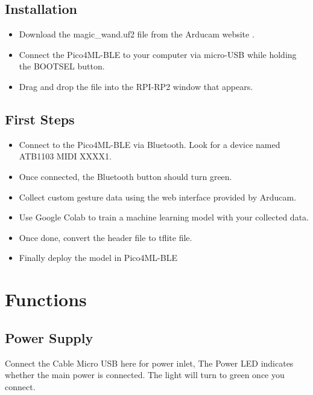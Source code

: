 \section{Installation}
\begin{itemize}
    \item Download the magic\_wand.uf2 file from the Arducam website .
    \item Connect the Pico4ML-BLE to your computer via micro-USB while holding the BOOTSEL button.
    \item Drag and drop the file   into the RPI-RP2 window that appears.\cite{arducamBuildMagic}
\end{itemize}



\section{First Steps}

\begin{itemize}
    \item Connect to the Pico4ML-BLE via Bluetooth. Look for a device named ATB1103 MIDI XXXX1.
    
    \item Once connected, the Bluetooth button should turn green.
    
    \item Collect custom gesture data using the web interface provided by Arducam.
    
    \item Use Google Colab to train a machine learning model with your collected data.
    \item Once done, convert the header file to tflite file.
    \item Finally deploy the model in Pico4ML-BLE
\end{itemize}


\chapter{Functions}

\section{Power Supply}
Connect the Cable Micro USB here for power inlet, The Power LED indicates whether the main power is connected. The light will turn to green once you connect.

